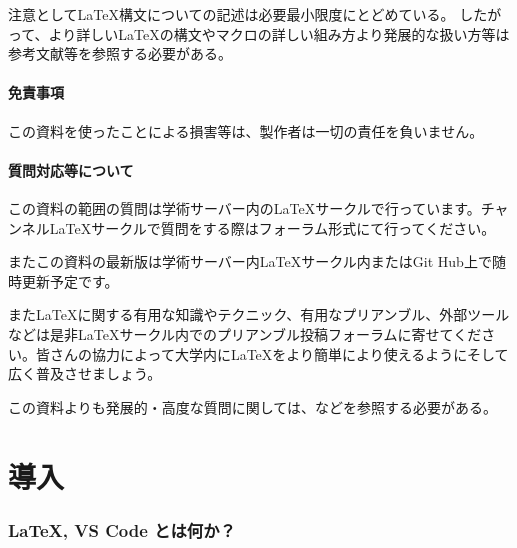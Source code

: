 \documentclass[titlepage]{ltjsarticle}
\begin{document}
注意として\LaTeX 構文についての記述は必要最小限度にとどめている。
したがって、より詳しい\LaTeX の構文やマクロの詳しい組み方より発展的な扱い方等は参考文献\cite{美文書本}\cite{一週間基礎}等を参照する必要がある。

\subsection{免責事項}

この資料を使ったことによる損害等は、製作者は一切の責任を負いません。

\subsection{質問対応等について}

この資料の範囲の質問は学術サーバー内のLaTeXサークルで行っています。チャンネルLaTeXサークルで質問をする際はフォーラム形式にて行ってください。

またこの資料の最新版は学術サーバー内LaTeXサークル内またはGit Hub上で随時更新予定です。

また\LaTeX に関する有用な知識やテクニック、有用なプリアンブル、外部ツールなどは是非LaTeXサークル内でのプリアンブル投稿フォーラムに寄せてください。皆さんの協力によって大学内に\LaTeX をより簡単により使えるようにそして広く普及させましょう。

この資料よりも発展的・高度な質問に関しては、\cite{TeXwiki-home}などを参照する必要がある。
\clearpage
\tableofcontents
\clearpage

\part{導入}
\section{\LaTeX , VS Code とは何か？}
\end{document}
